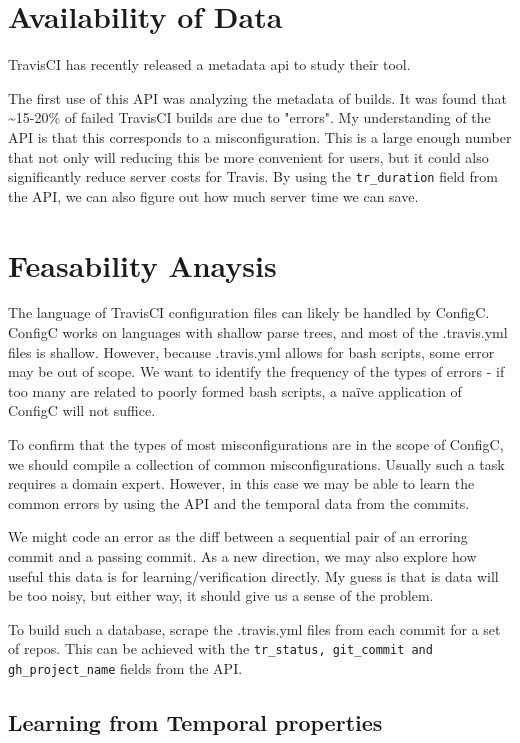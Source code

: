 \documentclass{sigplanconf}
\begin{document}
\section{Availability of Data}

TravisCI has recently released a metadata api to study their tool\cite{API}.

The first use of this API was analyzing the metadata of builds. It was found that \textasciitilde 15-20\% of failed TravisCI builds are due to "errors". My understanding of the API is that this corresponds to a misconfiguration. This is a large enough number that not only will reducing this be more convenient for users, but it could also significantly reduce server costs for Travis. By using the \verb|tr_duration| field from the API, we can also figure out how much server time we can save\cite{API}.


\section{Feasability Anaysis}
\label{sec:feas}

The language of TravisCI configuration files can likely be handled by ConfigC.
ConfigC works on languages with shallow parse trees, and most of the .travis.yml files is shallow.
However, because .travis.yml allows for bash scripts, some error may be out of scope.
We want to identify the frequency of the types of errors - if too many are related to poorly formed bash scripts, a naïve application of ConfigC will not suffice.

To confirm that the types of most misconfigurations are in the scope of ConfigC, we should compile a collection of common misconfigurations.
Usually such a task requires a domain expert.
However, in this case we may be able to learn the common errors by using the API and the temporal data from the commits.

We might code an error as the diff between a sequential pair of an erroring commit and a passing commit.
As a new direction, we may also explore how useful this data is for learning/verification directly.
My guess is that is data will be too noisy, but either way, it should give us a sense of the problem.

To build such a database, scrape the .travis.yml files from each commit for a set of repos.
This can be achieved with the \verb|tr_status, git_commit and gh_project_name| fields from the API.

\subsection{Learning from Temporal properties}
\end{document}
